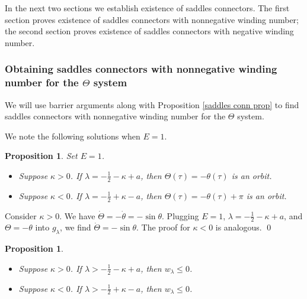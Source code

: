 \documentclass[11 pt]{article}
\newtheorem{prop}[thm]{Proposition}%
\renewcommand\l{\lambda}
\renewcommand\({\left(}
\renewcommand\){\right)}
\newcommand\<{\langle}
\renewcommand\>{\rangle}
\renewcommand\l{\lambda}
\newcommand\8{\infty}
\begin{document}
\medskip
\medskip

In the next two sections we establish existence of saddles connectors. The first section proves existence of saddles connectors with nonnegative winding number; the second section proves existence of saddles connectors with negative winding number. 

\medskip
\medskip

\subsubsection{Obtaining saddles connectors with nonnegative winding number for the $\Theta$ system}

\medskip

We will use barrier arguments along with Proposition \ref{saddles conn prop} to find saddles connectors with nonnegative winding number for the $\Theta$ system. 
 

\medskip
\medskip

We note the following solutions when $E = 1$.

\medskip

\begin{prop}\label{sol for E = 1 and la = -1 + a prop}
Set $E = 1$. 
\begin{itemize}
\item[$\bullet$] Suppose $\kappa > 0$. If $\l = -\frac{1}{2} - \kappa + a$, then $\Theta(\tau) = - \theta(\tau)$ is an orbit.

\item[$\bullet$] Suppose $\kappa < 0$. If $\l = -\frac{1}{2} + \kappa - a$, then $\Theta(\tau) = - \theta(\tau) + \pi$ is an orbit.
\end{itemize}
\end{prop}

\proof
Consider $\kappa > 0$. We have $\dot{\Theta} = -\dot{\theta} = -\sin \theta$. Plugging $E = 1$, $\l = -\frac{1}{2} - \kappa + a$, and $\Theta = - \theta$ into $g_\l$, we find $\dot{\Theta} = -\sin \theta$. The proof for $\kappa < 0$ is analogous. 
\qed

\medskip
\medskip



\begin{prop}\label{pos wind num theta prop 1}\: $\phantom{nix}$
\begin{itemize}
\item[$\bullet$] Suppose $\kappa > 0$. If $\l > -\frac{1}{2} - \kappa + a$, then $w_\l \leq 0$. 
\item[$\bullet$] Suppose $\kappa < 0$. If $\l > -\frac{1}{2} + \kappa - a$, then $w_\l \leq 0$. 
\end{itemize} 
\end{prop}
\end{document}
